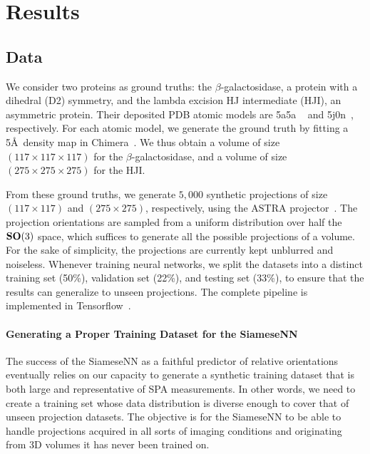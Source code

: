 \section{Results}

\subsection{Data}\label{sec:results:data}


We consider two proteins as ground truths: the $\beta$-galactosidase, a protein with a dihedral (D2) symmetry, and the lambda excision HJ intermediate (HJI), an asymmetric protein. Their deposited PDB atomic models are 5a5a ~\cite{bartesaghi2015betagal} and 5j0n~\cite{laxmikanthan2016structure}, respectively. For each atomic model, we generate the ground truth by fitting a 5\AA\ density map in Chimera~\cite{pettersen2004ucsf}. We thus obtain a volume of size $(117\times 117\times 117)$ for the $\beta$-galactosidase, and a volume of size $(275\times 275\times 275)$ for the HJI.

From these ground truths, we generate $5,000$ synthetic projections of size $(117\times 117)$ and $(275\times 275)$, respectively, using the ASTRA projector~\cite{van2015astra}. The projection orientations are sampled from a uniform distribution over half the $\mathrm{\mathbf{SO}}(3)$ space, which suffices to generate all the possible projections of a volume. For the sake of simplicity, the projections are currently kept unblurred and noiseless. Whenever training neural networks, we split the datasets into a distinct training set (50\%), validation set (22\%), and testing set (33\%), to ensure that the results can generalize to unseen projections. The complete pipeline is implemented in Tensorflow~\cite{abadi2016tensorflow}.

\paragraph{Generating a Proper Training Dataset for the SiameseNN}

The success of the SiameseNN as a faithful predictor of relative orientations eventually relies on our capacity to generate a synthetic training dataset that is both large and representative of SPA measurements. In other words, we need to create a training set whose data distribution is diverse enough to cover that of unseen projection datasets. The objective is for the SiameseNN to be able to handle projections acquired in all sorts of imaging conditions and originating from 3D volumes it has never been trained on.

